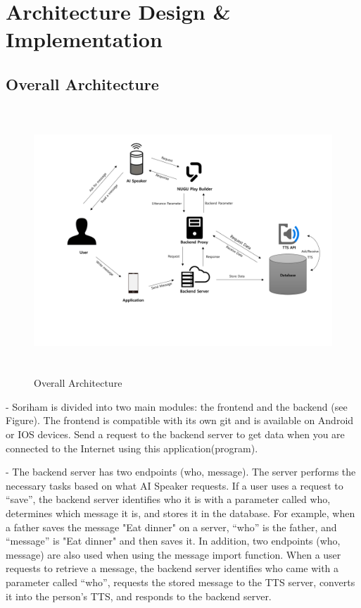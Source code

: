 \documentclass[conference]{IEEEtran}
\begin{document}
\section{Architecture Design \& Implementation}
\subsection{Overall Architecture}
\begin{figure}[htb!]
    \centering
    \includegraphics[height=10cm]{img/Overall Architecture.png}
    \caption{Overall Architecture}
\end{figure}
- Soriham is divided into two main modules: the frontend and the backend (see Figure). The frontend is compatible with its own git and is available on Android or IOS devices. Send a request to the backend server to get data when you are connected to the Internet using this application(program).

- The backend server has two endpoints (who, message). The server performs the necessary tasks based on what AI Speaker requests. If a user uses a request to “save”, the backend server identifies who it is with a parameter called who, determines which message it is, and stores it in the database. For example, when a father saves the message "Eat dinner" on a server, “who” is the father, and “message” is "Eat dinner" and then saves it.
In addition, two endpoints (who, message) are also used when using the message import function. When a user requests to retrieve a message, the backend server identifies who came with a parameter called “who”, requests the stored message to the TTS server, converts it into the person's TTS, and responds to the backend server.
\end{document}
